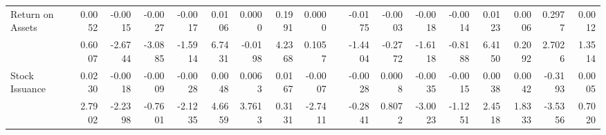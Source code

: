 \begin{table}[htbp]
{\begin{tabular}{lrrrrrrrrrrrrrrrrr}
      Return on Assets & 0.0052 & -0.0015 & -0.0027 & -0.0017 & 0.0106 & 0.0000 & 0.1991 & 0.0000 &       & -0.0175 & -0.0003 & -0.0018 & -0.0014 & 0.0123 & 0.0006 & 0.2977 & 0.0012 \\
            & 0.6007 & -2.6744 & -3.0885 & -1.5914 & 6.7431 & -0.0198 & 4.2368 & 0.1057 &       & -1.4404 & -0.2772 & -1.6118 & -0.8188 & 6.4150 & 0.2092 & 2.7026 & 1.3514 \\
      Stock Issuance & 0.0230 & -0.0018 & -0.0009 & -0.0028 & 0.0048 & 0.0063 & 0.0167 & -0.0007 &       & -0.0028 & 0.0008 & -0.0035 & -0.0015 & 0.0038 & 0.0042 & -0.3193 & 0.0005 \\
            & 2.7902 & -2.2398 & -0.7601 & -2.1235 & 4.6659 & 3.7613 & 0.3131 & -2.7411 &       & -0.2841 & 0.8072 & -3.0023 & -1.1251 & 2.4518 & 1.8333 & -3.5356 & 0.7020 \\
      \bottomrule
      \end{tabular}%
    }
    \label{tab:vol-ff6v}%
  \end{table}%
  